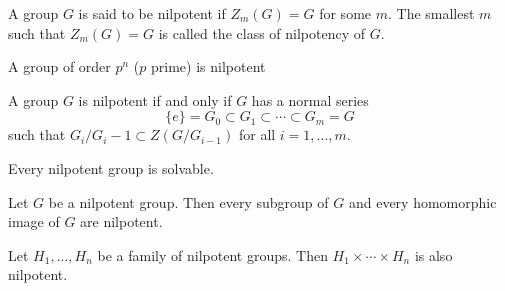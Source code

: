 \begin{defi}
    A group $G$ is said to be nilpotent if $Z_m(G)=G$ for some $m$. The smallest $m$ such that $Z_m(G)=G$ is called the class of nilpotency of $G$.
\end{defi}
\begin{teo}
    A group of order $p^n$ ($p$ prime) is nilpotent
\end{teo}
\begin{teo}
    A group $G$ is nilpotent if and only if $G$ has a normal series 
    \begin{equation*}
        \{e\}=G_0 \subset G_1\subset \cdots \subset G_m=G
    \end{equation*}
    such that $G_i/G_i-1\subset Z(G/G_{i-1})$ for all $i=1,...,m$.
\end{teo}
\begin{coro}
    Every nilpotent group is solvable.
\end{coro}
\begin{teo}
    Let $G$ be a nilpotent group. Then every subgroup of $G$ and every homomorphic image of $G$ are nilpotent.
\end{teo}
\begin{teo}
    Let $H_1,...,H_n$ be a family of nilpotent groups. Then $H_1\times\cdots\times H_n$ is also nilpotent.
\end{teo}